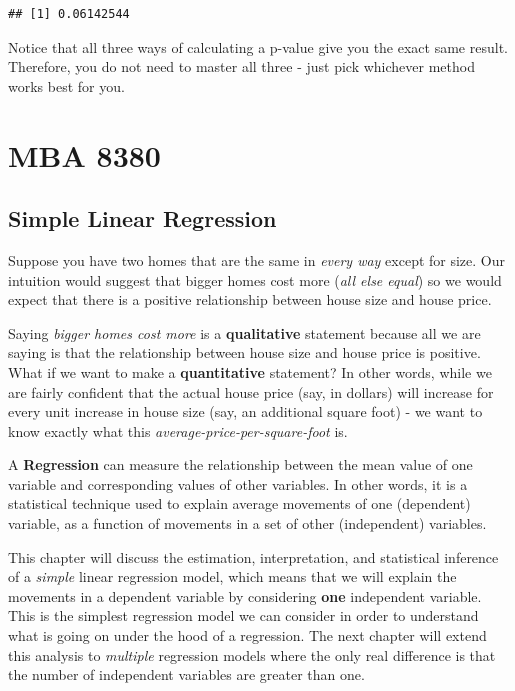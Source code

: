 \documentclass[
]{book}
\begin{document}
\begin{verbatim}
## [1] 0.06142544
\end{verbatim}

Notice that all three ways of calculating a p-value give you the exact same result. Therefore, you do not need to master all three - just pick whichever method works best for you.

\part*{MBA 8380}\label{part-mba-8380}

\chapter{Simple Linear Regression}\label{SLR}

Suppose you have two homes that are the same in \emph{every way} except for size. Our intuition would suggest that bigger homes cost more (\emph{all else equal}) so we would expect that there is a positive relationship between house size and house price.

Saying \emph{bigger homes cost more} is a \textbf{qualitative} statement because all we are saying is that the relationship between house size and house price is positive. What if we want to make a \textbf{quantitative} statement? In other words, while we are fairly confident that the actual house price (say, in dollars) will increase for every unit increase in house size (say, an additional square foot) - we want to know exactly what this \emph{average-price-per-square-foot} is.

A \textbf{Regression} can measure the relationship between the mean value of one variable and corresponding values of other variables. In other words, it is a statistical technique used to explain average movements of one (dependent) variable, as a function of movements in a set of other (independent) variables.

This chapter will discuss the estimation, interpretation, and statistical inference of a \emph{simple} linear regression model, which means that we will explain the movements in a dependent variable by considering \textbf{one} independent variable. This is the simplest regression model we can consider in order to understand what is going on under the hood of a regression. The next chapter will extend this analysis to \emph{multiple} regression models where the only real difference is that the number of independent variables are greater than one.
\end{document}

